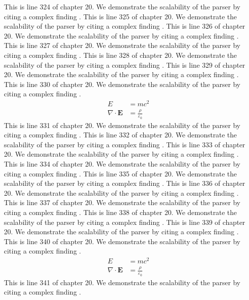This is line 324 of chapter 20. We demonstrate the scalability of the parser by citing a complex finding \cite{ref20_324}.
This is line 325 of chapter 20. We demonstrate the scalability of the parser by citing a complex finding \cite{ref20_325}.
This is line 326 of chapter 20. We demonstrate the scalability of the parser by citing a complex finding \cite{ref20_326}.
This is line 327 of chapter 20. We demonstrate the scalability of the parser by citing a complex finding \cite{ref20_327}.
This is line 328 of chapter 20. We demonstrate the scalability of the parser by citing a complex finding \cite{ref20_328}.
This is line 329 of chapter 20. We demonstrate the scalability of the parser by citing a complex finding \cite{ref20_329}.
This is line 330 of chapter 20. We demonstrate the scalability of the parser by citing a complex finding \cite{ref20_330}.
\begin{align*}
  E &= mc^2 \\
  \nabla \cdot \mathbf{E} &= \frac{\rho}{\varepsilon_0}
\end{align*}
This is line 331 of chapter 20. We demonstrate the scalability of the parser by citing a complex finding \cite{ref20_331}.
This is line 332 of chapter 20. We demonstrate the scalability of the parser by citing a complex finding \cite{ref20_332}.
This is line 333 of chapter 20. We demonstrate the scalability of the parser by citing a complex finding \cite{ref20_333}.
This is line 334 of chapter 20. We demonstrate the scalability of the parser by citing a complex finding \cite{ref20_334}.
This is line 335 of chapter 20. We demonstrate the scalability of the parser by citing a complex finding \cite{ref20_335}.
This is line 336 of chapter 20. We demonstrate the scalability of the parser by citing a complex finding \cite{ref20_336}.
This is line 337 of chapter 20. We demonstrate the scalability of the parser by citing a complex finding \cite{ref20_337}.
This is line 338 of chapter 20. We demonstrate the scalability of the parser by citing a complex finding \cite{ref20_338}.
This is line 339 of chapter 20. We demonstrate the scalability of the parser by citing a complex finding \cite{ref20_339}.
This is line 340 of chapter 20. We demonstrate the scalability of the parser by citing a complex finding \cite{ref20_340}.
\begin{align*}
  E &= mc^2 \\
  \nabla \cdot \mathbf{E} &= \frac{\rho}{\varepsilon_0}
\end{align*}
This is line 341 of chapter 20. We demonstrate the scalability of the parser by citing a complex finding \cite{ref20_341}.
